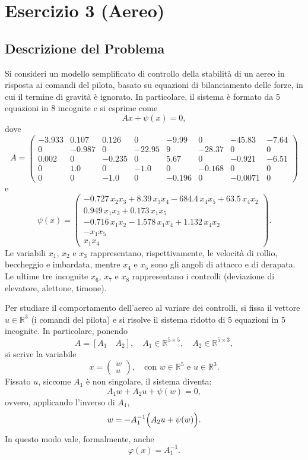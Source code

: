 \documentclass[11pt]{article}
\begin{document}




\section*{Esercizio 3 (Aereo)}

\subsection*{Descrizione del Problema}
Si consideri un modello semplificato di controllo della stabilità di un aereo in risposta ai comandi del pilota, basato su equazioni di bilanciamento delle forze, in cui il termine di gravità è ignorato. In particolare, il sistema è formato da 5 equazioni in 8 incognite e si esprime come
\[
A x + \psi(x) = 0,
\]
dove
\[
A =
\begin{pmatrix}
-3.933 & 0.107 & 0.126 & 0     & -9.99  & 0      & -45.83 & -7.64 \\
0      & -0.987& 0     & -22.95& 9      & -28.37& 0      & 0     \\
0.002  & 0     & -0.235& 0     & 5.67   & 0      & -0.921 & -6.51 \\
0      & 1.0   & 0     & -1.0  & 0      & -0.168& 0      & 0     \\
0      & 0     & -1.0  & 0     & -0.196 & 0      & -0.0071& 0
\end{pmatrix}
\]
e
\[
\psi(x)=
\begin{pmatrix}
-0.727\,x_2x_3 + 8.39\,x_3x_4 - 684.4\,x_4x_5 + 63.5\,x_4x_2 \\
0.949\,x_1x_3 + 0.173\,x_1x_5 \\
-0.716\,x_1x_2 - 1.578\,x_1x_4 + 1.132\,x_4x_2 \\
-x_1x_5 \\
x_1x_4
\end{pmatrix}.
\]
Le variabili \(x_1\), \(x_2\) e \(x_3\) rappresentano, rispettivamente, le velocità di rollio, beccheggio e imbardata, mentre \(x_4\) e \(x_5\) sono gli angoli di attacco e di derapata. Le ultime tre incognite \(x_6\), \(x_7\) e \(x_8\) rappresentano i controlli (deviazione di elevatore, alettone, timone).

Per studiare il comportamento dell’aereo al variare dei controlli, si fissa il vettore \( u\in\mathbb{R}^3 \) (i comandi del pilota) e si risolve il sistema ridotto di 5 equazioni in 5 incognite. In particolare, ponendo
\[
A = [A_1 \quad A_2],\quad A_1\in\mathbb{R}^{5\times5},\quad A_2\in\mathbb{R}^{5\times3},
\]
si scrive la variabile
\[
x = \begin{pmatrix} w \\ u \end{pmatrix},\quad \text{con } w\in\mathbb{R}^5 \text{ e } u\in\mathbb{R}^3.
\]
Fissato \(u\), siccome \(A_1\) è non singolare, il sistema diventa:
\[
A_1 w + A_2 u + \psi(w) = 0,
\]
ovvero, applicando l'inverso di \(A_1\),
\[
w = - A_1^{-1}\Bigl(A_2 u + \psi(w)\Bigr).
\]
In questo modo vale, formalmente, anche
\[
\varphi(x) = A_1^{-1}.
\]
\end{document}
